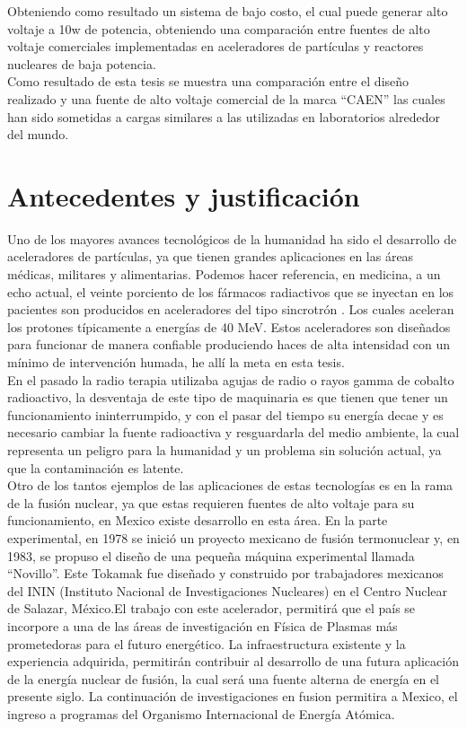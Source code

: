 Obteniendo como resultado un sistema de bajo costo, el cual puede generar alto voltaje a 10w de potencia, obteniendo una comparación entre fuentes de alto voltaje comerciales implementadas en aceleradores de partículas y reactores nucleares de baja potencia. \\

Como resultado de esta tesis se muestra una comparación entre el diseño realizado y una fuente de alto voltaje comercial de la marca ``CAEN'' las cuales han sido sometidas a cargas similares a las utilizadas en laboratorios alrededor del mundo.\newpage




\section{Antecedentes y justificación}


Uno de los mayores avances tecnológicos de la humanidad ha sido el desarrollo de aceleradores de partículas, ya que tienen grandes aplicaciones en las áreas médicas, militares y alimentarias. Podemos hacer referencia, en medicina, a un echo actual, el veinte porciento de los fármacos radiactivos que se inyectan en los pacientes son producidos en aceleradores del tipo sincrotrón \cite{ProyectoLNLS5}. Los cuales aceleran los protones típicamente a energías de 40 MeV. Estos aceleradores son diseñados para funcionar de manera confiable produciendo haces de alta intensidad con un mínimo de intervención humada, he allí la meta en esta tesis.\\

En el pasado la radio terapia utilizaba agujas de radio o rayos gamma de cobalto radioactivo, la desventaja de este tipo de maquinaria es que tienen que tener un funcionamiento ininterrumpido, y con el pasar del tiempo su energía decae y es necesario cambiar la fuente radioactiva y resguardarla del medio ambiente, la cual representa un peligro para la humanidad y un problema sin solución actual, ya que la contaminación es latente.\\

Otro de los tantos ejemplos de las aplicaciones de estas tecnologías es en la rama de la fusión nuclear, ya que estas requieren fuentes de alto voltaje para su funcionamiento, en Mexico existe desarrollo en esta área. En la parte experimental, en 1978 se inició un proyecto mexicano de fusión termonuclear y, en 1983, se propuso el diseño de una pequeña máquina experimental llamada “Novillo”. Este Tokamak fue diseñado y construido por trabajadores mexicanos del ININ (Instituto Nacional de Investigaciones Nucleares) en el Centro Nuclear de Salazar, México.El trabajo con este acelerador, permitirá que el país se incorpore a una de las áreas de investigación en Física de Plasmas más prometedoras para el futuro energético. La infraestructura existente y la experiencia adquirida, permitirán contribuir al desarrollo de una futura aplicación de la energía nuclear de fusión, la cual será una fuente alterna de energía en el presente siglo. La continuación de investigaciones en fusion permitira a Mexico, el ingreso a programas del Organismo Internacional de Energía Atómica\cite{ININ}.\\

